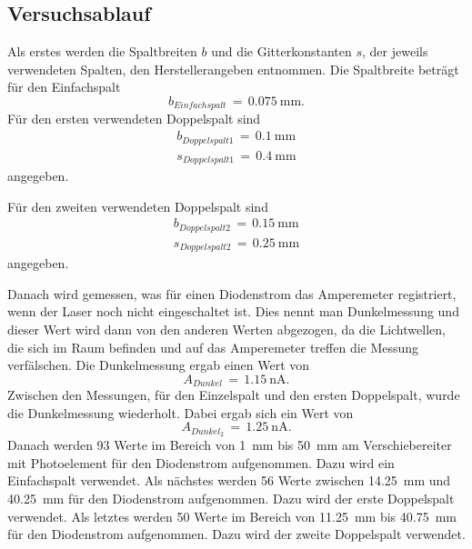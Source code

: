 \documentclass[
  bibliography=totoc,     %
  captions=tableheading,  %
  titlepage=firstiscover, %
]{scrartcl}
\begin{document}
\subsection{Versuchsablauf}
\label{sec:Versuchsablauf}
Als erstes werden die Spaltbreiten $b$ und die Gitterkonstanten $s$, der jeweils verwendeten Spalten, den Herstellerangeben entnommen.
Die Spaltbreite beträgt für den Einfachspalt
\begin{equation}
  b_{Einfachspalt}\,=\,\SI{0.075}{\milli\metre}.
  \label{eqn:einfachspalt}
\end{equation}
Für den ersten verwendeten Doppelspalt sind
\begin{align}
  b_{Doppelspalt 1}\,=\,\SI{0.1}{\milli\metre}\\
  s_{Doppelspalt 1}\,=\,\SI{0.4}{\milli\metre}
  \label{eqn:doppelspalt1}
\end{align}
angegeben.

\noindent
Für den zweiten verwendeten Doppelspalt sind
\begin{align}
  b_{Doppelspalt 2}\,=\,\SI{0.15}{\milli\metre}\\
  s_{Doppelspalt 2}\,=\,\SI{0.25}{\milli\metre}
  \label{eqn:doppelspalt2}
\end{align}
angegeben.

\noindent
Danach wird gemessen, was für einen Diodenstrom das Amperemeter registriert, wenn der Laser noch nicht eingeschaltet ist. Dies nennt man Dunkelmessung und dieser Wert wird dann von den anderen Werten abgezogen, da die Lichtwellen, die sich im Raum befinden und auf das Amperemeter treffen die Messung verfälschen.
Die Dunkelmessung ergab einen Wert von
\begin{equation}
  A_{Dunkel}\,=\,\SI{1.15}{\nano\ampere}.
  \label{eqn:dunkel}
\end{equation}
Zwischen den Messungen, für den Einzelspalt und den ersten Doppelspalt, wurde die Dunkelmessung wiederholt.
Dabei ergab sich ein Wert von
\begin{equation}
  A_{Dunkel_2}\,=\,\SI{1.25}{\nano\ampere}.
  \label{eqn:dunkel2}
\end{equation}
Danach werden 93 Werte im Bereich von \SI{1}{\milli\metre} bis \SI{50}{\milli\metre} am Verschiebereiter mit Photoelement für den Diodenstrom aufgenommen. Dazu wird ein Einfachspalt verwendet.
Als nächstes werden 56 Werte zwischen \SI{14.25}{\milli\metre} und \SI{40.25}{\milli\metre} für den Diodenstrom aufgenommen. Dazu wird der erste Doppelspalt verwendet.
Als letztes werden 50 Werte im Bereich von \SI{11.25}{\milli\metre} bis \SI{40.75}{\milli\metre} für den Diodenstrom aufgenommen. Dazu wird der zweite Doppelspalt verwendet.
\clearpage
\end{document}
